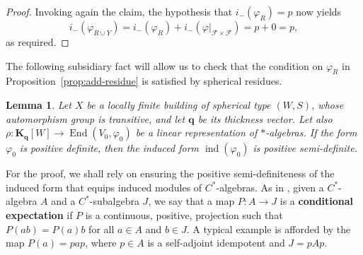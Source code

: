 \documentclass[12pt,a4paper]{amsproc}
\newtheorem{lemma}[theorem]{Lemma}
\theoremstyle{definition}
\DeclareMathOperator{\End}{End}
\DeclareMathOperator{\Ind}{ind}
\newcommand{\KK}{\mathbf K}
\begin{document}
\begin{proof}
Invoking again the claim, the hypothesis that $i_-(\varphi_R)=p$ now yields
$$i_-(\varphi_{R \cup Y}) = i_-(\varphi_R) + i_-(\varphi|_{\mathscr F \times \mathscr F}) = p +0 = p, $$ 
as required. 
\end{proof}
		
The following subsidiary fact will allow us to check that the condition on $\varphi_R$ in Proposition~\ref{prop:add-residue} is satisfied by spherical residues. 
		
\begin{lemma}\label{lem:spherical-residue-positivity}
Let $X$ be a locally finite building of \emph{spherical} type $(W, S)$, whose automorphism group is transitive, and let $\mathbf q$ be its thickness vector. Let also  $\rho \colon \KK_{\mathbf q}[W]\to \End(V_0, \varphi_0)$ be a linear representation of $*$-algebras. If the form $\varphi_0$ is positive definite, then the induced form $\Ind(\varphi_0)$ is positive semi-definite. 
\end{lemma}
 

For the proof, we shall rely on \cite[Lemma~1.7]{Rieffel} ensuring the positive semi-definiteness of  the induced form that equips  induced modules of $C^*$-algebras. As in \cite[Definition~1.3]{Rieffel}, given a $C^*$-algebra $A$ and a $C^*$-subalgebra $J$, we say that a map $P \colon A \to J$ is a \textbf{conditional expectation} if $P$ is a continuous, positive, projection such that $P(ab) = P(a)b$ for all $a \in A$ and $b \in J$. A typical example is afforded by the map   $P(a) = pap$, where $p \in A$ is a self-adjoint idempotent and $J = pAp$.  
\end{document}
